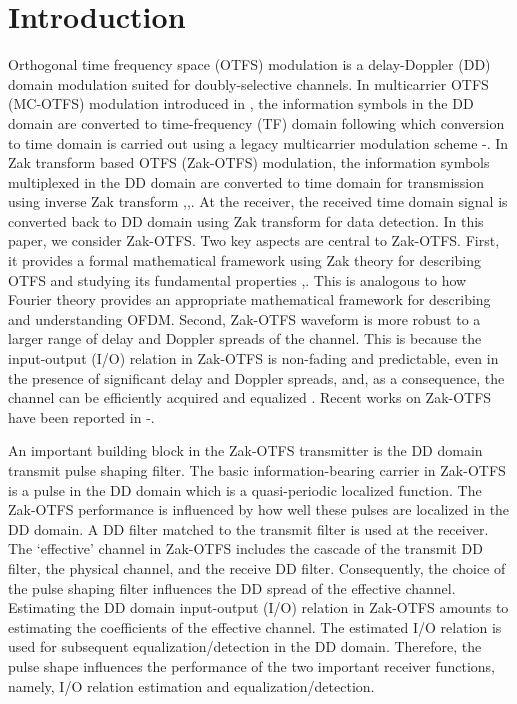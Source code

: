 \vspace{-2mm}
\section{Introduction}
\label{sec1}
Orthogonal time frequency space (OTFS) modulation is a delay-Doppler (DD) domain modulation suited for doubly-selective channels. In multicarrier OTFS (MC-OTFS) modulation introduced in \cite{otfs1}, the information symbols in the DD domain are converted to time-frequency (TF) domain following which conversion to time domain is carried out using a legacy multicarrier modulation scheme \cite{otfs2}-\cite{h_b_mishra}. In Zak transform based OTFS (Zak-OTFS) modulation, the information symbols multiplexed in the DD domain are converted to time domain for transmission using inverse Zak transform \cite{zak_otfs1},\cite{zak_otfs2},\cite{zak_otfs3}. At the receiver, the received time domain signal is converted back to DD domain using Zak transform for data detection. In this paper, we consider Zak-OTFS. Two key aspects are central to Zak-OTFS. First, it provides a formal mathematical framework using Zak theory for describing OTFS and studying its fundamental properties \cite{zak_otfs1},\cite{zak_otfs3}. This is analogous to how Fourier theory provides an appropriate mathematical framework for describing and understanding OFDM. Second, Zak-OTFS waveform is more robust to a larger range of delay and Doppler spreads of the channel. This is because the input-output (I/O) relation in Zak-OTFS is non-fading and predictable, even in the presence of significant delay and Doppler spreads, and, as a consequence, the channel can be efficiently acquired and equalized \cite{zak_otfs2}. Recent works on Zak-OTFS have been reported in \cite{zak_otfs4}-\cite{zak_otfs8}.

An important building block in the Zak-OTFS transmitter is the DD domain transmit pulse shaping filter. The basic information-bearing carrier in Zak-OTFS is a pulse in the DD domain which is a quasi-periodic localized function. The Zak-OTFS performance is influenced by how well these pulses are localized in the DD domain. A DD filter matched to the transmit filter is used at the receiver. The `effective' channel in Zak-OTFS includes the cascade of the transmit DD filter, the physical channel, and the receive DD filter. Consequently, the choice of the pulse shaping filter influences the DD spread of the effective channel. Estimating the DD domain input-output (I/O) relation in Zak-OTFS amounts to estimating the coefficients of the effective channel. The estimated I/O relation is used for subsequent equalization/detection in the DD domain. Therefore, the pulse shape influences the performance of the two important receiver functions, namely, I/O relation estimation and equalization/detection. 
    
